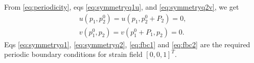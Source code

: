 \documentclass[openright,twoside]{iitkthesis}
\begin{document}
From \eqref{eq:periodicity}, eqs \eqref{eq:symmetryq1u}, and \eqref{eq:symmetryq2v}, we get
\begin{eqnarray}
\label{eq:fbc1}
u(p_1, p_2^0) = u(p_1, p_2^0+P_2) = 0,\\
\label{eq:fbc2}
v(p_1^0, p_2) = v(p_1^0+P_1, p_2) = 0.
\end{eqnarray}
Eqs \eqref{eq:symmetryq1}, \eqref{eq:symmetryq2}, \eqref{eq:fbc1} and 
\eqref{eq:fbc2} are the required periodic boundary conditions for strain field $[0, 0, 1]^T$.\\
\vspace{-1cm}
\begin{figure}[H]
\begin{center}
\end{center}
\end{figure}
\end{document}
